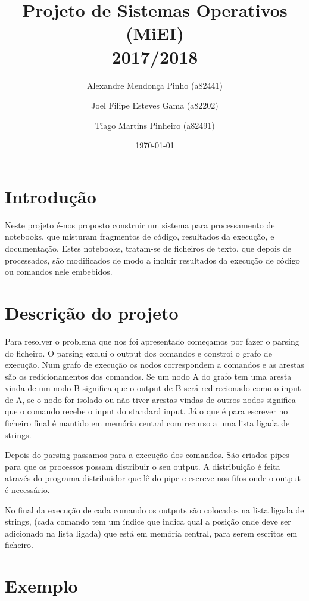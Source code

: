 \documentclass[12pt]{report}
\title{Projeto de Sistemas Operativos (MiEI) \\ 2017/2018}
\author{Alexandre Mendonça Pinho (a82441) \and Joel Filipe Esteves Gama (a82202) \and Tiago Martins Pinheiro (a82491)}
\date{\today}
\newcommand\tab[1][0.5cm]{\hspace*{#1}}
\begin{document}
\maketitle

\tableofcontents

\chapter{Introdução}
\label{sec:introducao}

\tab Neste projeto é-nos proposto construir um sistema para processamento de notebooks, que misturam fragmentos de código, resultados da execução, e documentação. Estes notebooks, tratam-se de ficheiros de texto, que depois de processados, são modificados de modo a incluir resultados da execução de código ou comandos nele embebidos.

\chapter{Descrição do projeto}
\label{sec:descricao}

\tab Para resolver o problema que nos foi apresentado começamos por fazer o parsing do ficheiro. O parsing excluí o output dos comandos e constroi o grafo de execução. Num grafo de execução os nodos correspondem a comandos e as arestas são os redicionamentos dos comandos. Se um nodo A do grafo tem uma aresta vinda de um nodo B significa que o output de B será redirecionado como o input de A, se o nodo for isolado ou não tiver arestas vindas de outros nodos significa que o comando recebe o input do standard input. Já o que é para escrever no ficheiro final é mantido em memória central com recurso a uma lista ligada de strings.

Depois do parsing passamos para a execução dos comandos. São criados pipes para que os processos possam distribuir o seu output. A distribuição é feita através do programa distribuidor que lê do pipe e escreve nos fifos onde o output é necessário.

No final da execução de cada comando os outputs são colocados na lista ligada de strings, (cada comando tem um índice que indica qual a posição onde deve ser adicionado na lista ligada) que está em memória central, para serem escritos em ficheiro.
\chapter{Exemplo}

\label{sec:exemplo}
\end{document}
